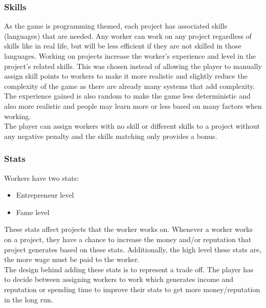 \documentclass[11pt]{article}
\newcommand{\n}[0]{\\[\baselineskip]}
\begin{document}
\subsubsection{Skills}
As the game is programming themed, each project has associated skills (languages) that are needed. Any worker can work on any project regardless of skills like in real life, but will be less efficient if they are not skilled in those languages. Working on projects increase the worker's experience and level in the project's related skills. This was chosen instead of allowing the player to manually assign skill points to workers to make it more realistic and slightly reduce the complexity of the game as there are already many systems that add complexity. The experience gained is also random to make the game less deterministic and also more realistic and people may learn more or less based on many factors when working.
\n
The player can assign workers with no skill or different skills to a project without any negative penalty and the skills matching only provides a bonus. 

\subsubsection{Stats}
Workers have two stats:
\begin{itemize}
\item Entrepreneur level
\item Fame level
\end{itemize}
These stats affect projects that the worker works on. Whenever a worker works on a project, they have a chance to increase the money and/or reputation that project generates based on these stats. Additionally, the high level these stats are, the more wage must be paid to the worker. 
\n
The design behind adding these stats is to represent a trade off. The player has to decide between assigning workers to work which generates income and reputation or spending time to improve their stats to get more money/reputation in the long run. 
\end{document}
